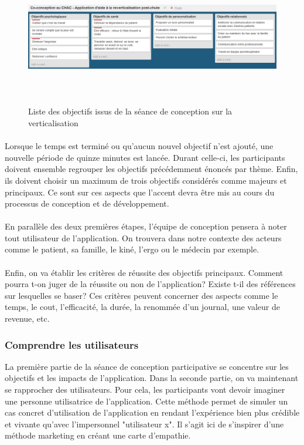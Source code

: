 \begin{figure}
	\centering
	\includegraphics[width = 16cm, height=6cm]{images/objectifs_ales.png}
	\caption{Liste des objectifs issus de la séance de conception sur la verticalisation}
	\label{objectifs_ales}
\end{figure}

\paragraph{} Lorsque le temps est terminé ou qu'aucun nouvel objectif n'est ajouté, une nouvelle période de quinze minutes est lancée. Durant celle-ci, les participants doivent ensemble regrouper les objectifs précédemment énoncés par thème. Enfin, ils doivent choisir un maximum de trois objectifs considérés comme majeurs et principaux. Ce sont sur ces aspects que l'accent devra être mis au cours du processus de conception et de développement.

\paragraph{}En parallèle des deux premières étapes, l'équipe de conception pensera à noter tout utilisateur de l'application. On trouvera dans notre contexte des acteurs comme le patient, sa famille, le kiné, l'ergo ou le médecin par exemple.

\paragraph{}Enfin, on va établir les critères de réussite des objectifs principaux. Comment pourra t-on juger de la réussite ou non de l'application? Existe t-il des références sur lesquelles se baser? Ces critères peuvent concerner des aspects comme le temps, le cout, l'efficacité, la durée, la renommée d'un journal, une valeur de revenue, etc.
	
	\subsubsection*{Comprendre les utilisateurs}
La première partie de la séance de conception participative se concentre sur les objectifs et les impacts de l'application. Dans la seconde partie, on va maintenant se rapprocher 	des utilisateurs. Pour cela, les participants vont devoir imaginer une personne utilisatrice de l'application. Cette méthode permet de simuler un cas concret d'utilisation de l'application en rendant l'expérience bien plus crédible et vivante qu'avec l'impersonnel "utilisateur x". Il s'agit ici de s'inspirer d'une méthode marketing en créant une carte d'empathie.

